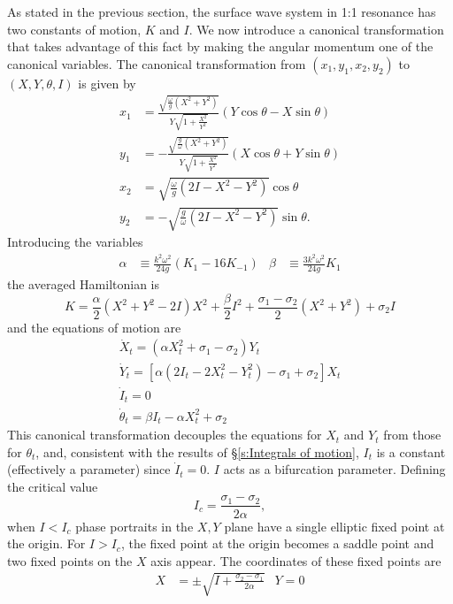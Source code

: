 As stated in the previous section, the surface wave system in 1:1 resonance has two constants of motion, $K$ and $I$. We now introduce a canonical transformation that takes advantage of this fact by making the angular momentum one of the canonical variables. The canonical transformation from $(x_1,y_1,x_2,y_2)$ to $(X,Y,\theta,I)$ is given by
\begin{align*}
x_1& = \frac{\sqrt{\frac{\omega}{g}(X^2+Y^2)}}{Y \sqrt{1+\frac{X^2}{Y^2}}} (Y \cos \theta - X \sin \theta)\\
y_1& = -\frac{\sqrt{\frac{g}{\omega}(X^2+Y^2)}}{Y \sqrt{1+\frac{X^2}{Y^2}}} (X \cos \theta + Y \sin \theta)\\
x_2& = \sqrt{\frac{\omega}{g} (2I-X^2-Y^2)} \cos \theta\\
y_2& = -\sqrt{\frac{g}{\omega} (2I-X^2-Y^2)} \sin \theta.
\end{align*}
Introducing the variables
\begin{align*}
\alpha &\equiv \frac{k^2 \omega^2}{24 g}(K_1 - 16 K_{-1}) & \beta 
&\equiv \frac{3 k^2 \omega^2}{24 g} K_1
\end{align*}
the averaged Hamiltonian is
\begin{equation}
\label{e:averaged K}
K = \frac{\alpha}{2} (X^2 + Y^2 - 2 I) X^2 + \frac{\beta}{2} I^2 + \frac{\sigma_1 - \sigma_2}{2}(X^2 + Y^2) + \sigma_2 I
\end{equation}
and the equations of motion are
\begin{equation}
\label{e:sgwaves fast planar}
\begin{gathered}
\dot{X}_t = (\alpha X_t^2 + \sigma_1 - \sigma_2) Y_t\\
\dot{Y}_t = [\alpha(2I_t - 2X_t^2 - Y_t^2) - \sigma_1 + \sigma_2] X_t\\
\dot I_t = 0\\
\dot \theta_t = \beta I_t - \alpha X_t^2 + \sigma_2
\end{gathered}
\end{equation}
This canonical transformation decouples the equations
for $X_t$ and $Y_t$ from those for $\theta_t$, and, consistent with
the results of \S\ref{s:Integrals of motion}, $I_t$ is a
constant (effectively a parameter) since $\dot{I}_t=0$. $I$ acts as a
bifurcation parameter. Defining the critical value
\begin{equation}
I_c = \frac{\sigma_1 - \sigma_2}{2 \alpha},
\end{equation}
when $I<I_c$ phase portraits in the $X,Y$ plane have a single elliptic
fixed point at the origin. For $I>I_c$, the fixed point at the origin
becomes a saddle point and two fixed points on the $X$ axis
appear. The coordinates of these fixed points are
\begin{align}
X &= \pm \sqrt{I + \frac{\sigma_2 - \sigma_1}{2 \alpha}} &
Y = 0
\end{align}

